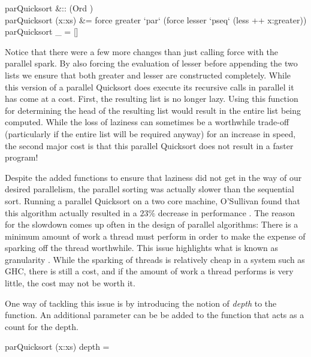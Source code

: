 \begin{haskell}
parQuicksort &:: (Ord \hasalpha) \Rightarrow [\hasalpha] \to [\hasalpha]\\
parQuicksort (x:xs) &= force greater `par` (force lesser `pseq` (less ++ x:greater))
parQuicksort \_ = []
\end{haskell}

Notice that there were a few more changes than just calling \<force\> with
the parallel spark. By also forcing the evaluation of \<lesser\> before
appending the two lists we ensure that both \<greater\> and \<lesser\>
are constructed completely. While this version of a parallel Quicksort does
execute its recursive calls in parallel it has come at a cost. First, the
resulting list is no longer lazy. Using this function for determining the head
of the resulting list would result in the entire list being computed. While
the loss of laziness can sometimes be a worthwhile trade-off (particularly
if the entire list will be required anyway) for an increase in speed, the
second major cost is that this parallel Quicksort does not result in a faster
program!

    Despite the added functions to ensure that laziness did not get in the way
of our desired parallelism, the parallel sorting was actually slower than the
sequential sort. Running a parallel Quicksort on a two core machine, O'Sullivan
found that this algorithm actually resulted in a $23\%$ decrease in
performance \citep{realWorld}. The reason for the slowdown comes up often in the
design of parallel algorithms: There is a minimum amount of work a thread must
perform in order to make the expense of sparking off the thread worthwhile. This
issue highlights what is known as granularity \citep{dutchBook}. While the sparking
of threads is relatively cheap in a system such as GHC, there is still a cost,
and if the amount of work a thread performs is very little, the cost may not be
worth it.

    One way of tackling this issue is by introducing the notion of \emph{depth}
to the function. An additional parameter can be be added to the function that
acts as a count for the depth.

\begin{haskell}
parQuicksort (x:xs) depth = 
\end{haskell}

